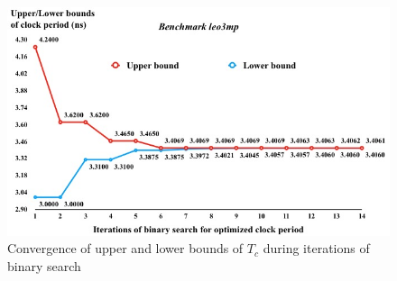\begin{figure}
    \centering
    \includegraphics[width=0.8\columnwidth]{leo3mp_Tc.png} %
    \caption{Convergence of upper and lower bounds of $T_{c}$ during iterations of binary search}
    \label{fig:Tc}
\end{figure}